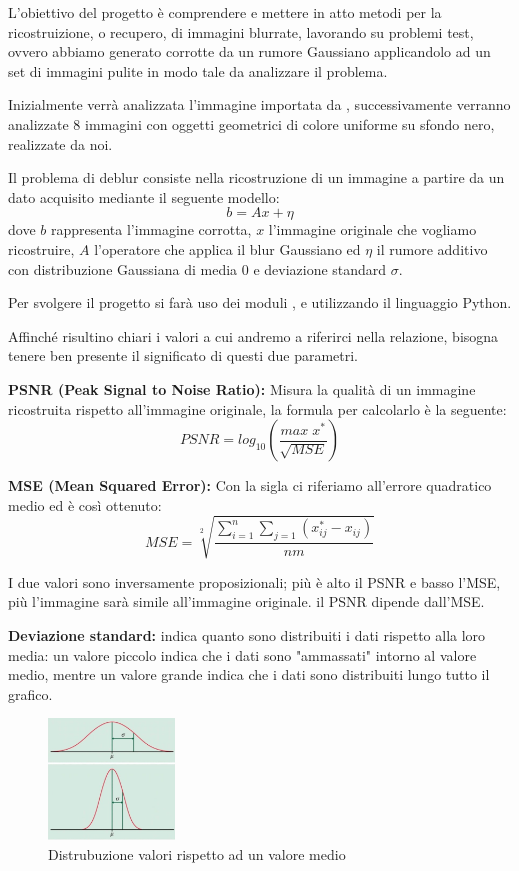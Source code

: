 L'obiettivo del progetto è comprendere e mettere in atto metodi per la ricostruizione, o recupero, di 
immagini blurrate, lavorando su problemi test, ovvero abbiamo generato corrotte da un rumore 
Gaussiano applicandolo ad un set di immagini pulite in modo tale da analizzare il problema. 

Inizialmente verrà analizzata l'immagine  importata da
, successivamente verranno analizzate 8 immagini con oggetti geometrici
 di colore uniforme su sfondo nero, realizzate da noi.

Il problema di deblur consiste nella ricostruzione di un immagine a partire da un dato acquisito
 mediante il seguente modello:
\[b=Ax+\eta\]
dove $b$ rappresenta l'immagine corrotta, $x$ l'immagine originale che vogliamo ricostruire, $A$ 
l'operatore che applica il blur Gaussiano ed $\eta$ il rumore additivo con distribuzione Gaussiana di
 media 0 e deviazione standard $\sigma$.

Per svolgere il progetto si farà uso dei moduli ,  e 
utilizzando il linguaggio Python.

Affinché risultino chiari i valori a cui andremo a riferirci nella relazione, bisogna tenere ben presente 
il significato di questi due parametri. 

\textbf{PSNR (Peak Signal to Noise Ratio):} Misura la qualità di un immagine ricostruita rispetto all'immagine 
originale, la formula per calcolarlo è la seguente: \[PSNR = log_{10}(\frac{max\;x^\ast}{\sqrt{MSE}})\]

\textbf{MSE (Mean Squared Error):}  Con la sigla ci riferiamo all'errore quadratico medio ed è così ottenuto:
 \[MSE = \sqrt[2]{\frac{\sum_{i=1}^n\sum_{j=1}(x^{\ast}_{ij}-x_{ij})}{nm}}\]

I due valori sono inversamente proposizionali; più è alto il PSNR e basso l'MSE, più l'immagine sarà 
simile all'immagine originale. il PSNR dipende dall'MSE.

\textbf{Deviazione standard:} indica quanto sono distribuiti i dati rispetto alla loro media: 
un valore piccolo indica che i dati sono "ammassati" intorno al valore medio, 
mentre un valore grande indica che i dati sono distribuiti lungo tutto il grafico.

\begin{figure}[H]\centering
	\includegraphics[width=0.3\textwidth]{MANCANTI/deviazione standard.jpg}
	\caption{Distrubuzione valori rispetto ad un valore medio}
\end{figure}